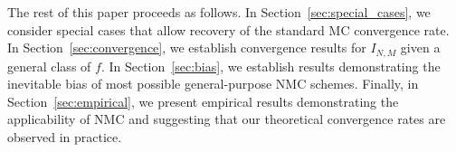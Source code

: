 The rest of this paper proceeds as follows. In Section~\ref{sec:special_cases}, we consider
special cases that allow recovery of the standard MC convergence rate.
In Section~\ref{sec:convergence}, we establish convergence results for $I_{N,M}$ given a
general class of $f$. In Section~\ref{sec:bias}, we establish results demonstrating the
inevitable bias of most possible general-purpose NMC schemes. Finally, in Section~\ref{sec:empirical}, 
we present empirical results demonstrating the applicability of NMC and suggesting that our theoretical 
convergence rates are observed in practice.
